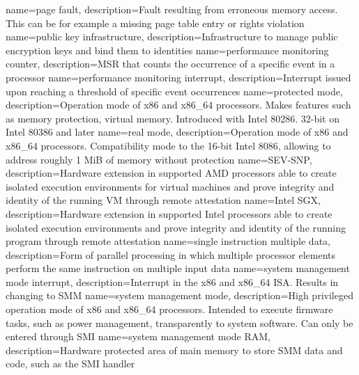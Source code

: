 {
  name=page fault,
  description={Fault resulting from erroneous memory access. This can be for example a missing page table entry or
  rights violation}
}
{
  name=public key infrastructure,
  description={Infrastructure to manage public encryption keys and bind them to identities}
}
{
  name=performance monitoring counter,
  description={MSR that counts the occurrence of a specific event in a processor}
}
{
  name=performance monitoring interrupt,
  description={Interrupt issued upon reaching a threshold of specific event occurrences}
}
{
  name=protected mode,
  description={Operation mode of x86 and x86\_64 processors. Makes features such as memory protection, virtual memory.
  Introduced with Intel 80286. 32-bit on Intel 80386 and later}
}
%
{
  name=real mode,
  description={Operation mode of x86 and x86\_64 processors. Compatibility mode to the 16-bit Intel 8086, allowing to
  address roughly 1 MiB of memory without protection}
}
%
{
  name=SEV-SNP,
  description={Hardware extension in supported AMD processors able to create isolated execution environments for
  virtual machines and prove integrity and identity of the running VM through remote attestation}
}
{
  name=Intel SGX,
  description={Hardware extension in supported Intel processors able to create isolated execution environments and
  prove integrity and identity of the running program through remote attestation}
}
{
  name={single instruction multiple data},
  description={Form of parallel processing in which multiple processor elements perform the same instruction on
  multiple input data}
}
{
  name=system management mode interrupt,
  description={Interrupt in the x86 and x86\_64 ISA. Results in changing to SMM}
}
{
  name=system management mode,
  description={High privileged operation mode of x86 and x86\_64 processors. Intended to execute firmware tasks, such
  as power management, transparently to system software. Can only be entered through SMI}
}
{
  name=system management mode RAM,
  description={Hardware protected area of main memory to store SMM data and code, such as the
  SMI handler}
}
